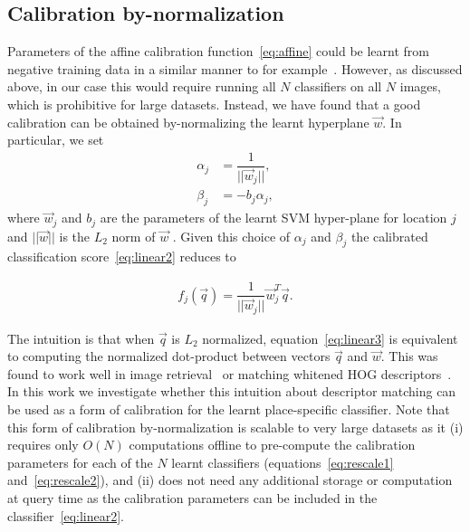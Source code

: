    \subsection{Calibration by-normalization}
   Parameters of the affine calibration function~\eqref{eq:affine} could be learnt from negative training data in a similar manner to for example~\cite{Aubry14}. 
   However, as discussed above, in our case this would require running all $N$ classifiers on all $N$ images, which is prohibitive for large datasets.
   Instead, we have found that a good calibration can be obtained by-normalizing the learnt hyperplane $\vec{w}$. In particular, we set 
   \begin{align}
   \label{eq:rescale1}
   \alpha_j &= \dfrac{1}{||\vec{w}_j||},\\ 
   \label{eq:rescale2}
    \beta_j &=  -b_j \alpha_j, 
   \end{align}
   where $\vec{w}_j$ and $b_j$ are the parameters of the learnt SVM hyper-plane for location $j$ and $||\vec{w}||$ is the $L_2$ norm of $\vec{w}$ . Given this choice of $\alpha_j$ and $\beta_j$
   the calibrated classification score~\eqref{eq:linear2} reduces to

      \begin{align}
        f_j(\vec{q}) = \dfrac{1}{||\vec{w}_j||}\vec{w}_j^T\vec{q}.
            \label{eq:linear3}
     \end{align}

     The intuition is that when $\vec{q}$ is $L_2$ normalized, equation~\eqref{eq:linear3} is equivalent to computing the normalized dot-product between vectors $\vec{q}$ and $\vec{w}$.       This was found to work well in image retrieval~\cite{Sivic03} or matching whitened HOG descriptors~\cite{Doersch13}.
In this work we investigate whether this intuition about descriptor matching can be used as a form of calibration for the learnt place-specific classifier.  
      Note  that this form of calibration by-normalization is scalable to very large datasets as it (i) requires only $O(N)$ computations offline to pre-compute the calibration parameters for each of the $N$ learnt classifiers (equations~\eqref{eq:rescale1} and~\eqref{eq:rescale2}), and (ii) does not need any additional storage or computation at query time as the calibration parameters can be included in the classifier~\eqref{eq:linear2}.   
   
